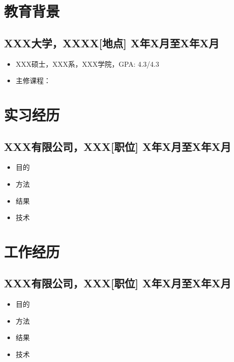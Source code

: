 \documentclass[a4paper,10pt]{article}
\begin{document}
\subsection*{}
\subsection*{}

\section*{教育背景}
\subsection*{XXX大学，XXXX[地点] \hfill X年X月至X年X月}
\begin{itemize}
    \item XXX硕士，XXX系，XXX学院，GPA: 4.3/4.3
    \item 主修课程：
\end{itemize}

\section*{实习经历}
\subsection*{XXX有限公司，XXX[职位] \hfill X年X月至X年X月}
\begin{itemize}
    \item 目的
    \item 方法
    \item 结果
    \item 技术
\end{itemize}

\section*{工作经历}
\subsection*{XXX有限公司，XXX[职位] \hfill X年X月至X年X月}
\begin{itemize}
    \item 目的
    \item 方法
    \item 结果
    \item 技术
\end{itemize}
\end{document}
